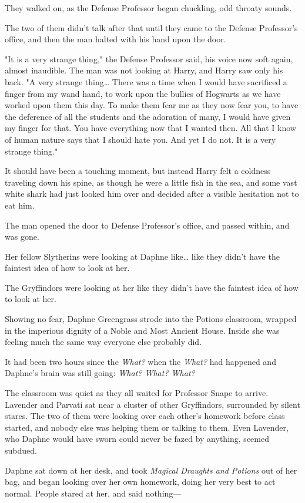 They walked on, as the Defense Professor began chuckling, odd throaty sounds.

The two of them didn't talk after that until they came to the Defense
Professor's office, and then the man halted with his hand upon the door.

"It is a very strange thing," the Defense Professor said, his voice now soft
again, almost inaudible. The man was not looking at Harry, and Harry saw only
his back. "A very strange thing{\ldots} There was a time when I would have
sacrificed a finger from my wand hand, to work upon the bullies of Hogwarts as
we have worked upon them this day. To make them fear me as they now fear you,
to have the deference of all the students and the adoration of many, I would
have given my finger for that. You have everything now that I wanted then. All
that I know of human nature says that I should hate you. And yet I do not. It
is a very strange thing."

It should have been a touching moment, but instead Harry felt a coldness
traveling down his spine, as though he were a little fish in the sea, and some
vast white shark had just looked him over and decided after a visible
hesitation not to eat him.

The man opened the door to Defense Professor's office, and passed within, and
was gone.

Her fellow Slytherins were looking at Daphne like{\ldots} like they didn't have
the faintest idea of how to look at her.

The Gryffindors were looking at her like they didn't have the faintest idea of
how to look at her.

Showing no fear, Daphne Greengrass strode into the Potions classroom, wrapped
in the imperious dignity of a Noble and Most Ancient House. Inside she was
feeling much the same way everyone else probably did.

It had been two hours since the \emph{What?} when the \emph{What?} had happened
and Daphne's brain was still going: \emph{What? What? What?}

The classroom was quiet as they all waited for Professor Snape to arrive.
Lavender and Parvati sat near a cluster of other Gryffindors, surrounded by
silent stares. The two of them were looking over each other's homework before
class started, and nobody else was helping them or talking to them. Even
Lavender, who Daphne would have sworn could never be fazed by anything, seemed
subdued.

Daphne sat down at her desk, and took \emph{Magical Draughts and Potions} out
of her bag, and began looking over her own homework, doing her very best to act
normal. People stared at her, and said nothing---

